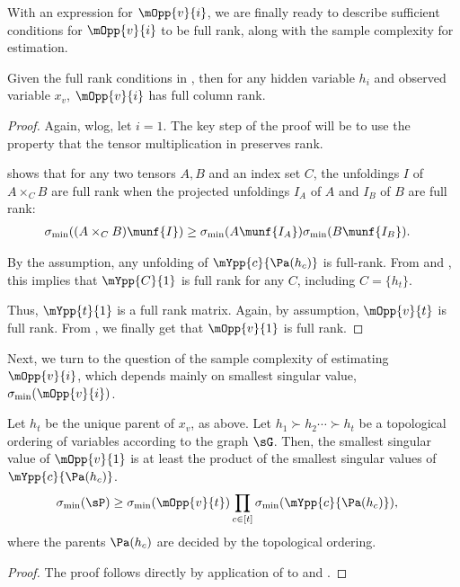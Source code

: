 With an expression for $\mOpp{v}{i}$, we are finally ready to describe
sufficient conditions for $\mOpp{v}{i}$ to be full rank, along with the
sample complexity for estimation.

\begin{lemma}
  \label{lem:full-rank-suff}
  Given the full rank conditions in , then
  for any hidden variable $h_i$ and observed variable $x_v$,
  $\mOpp{v}{i}$ has full column rank.
\end{lemma}
\begin{proof}
Again, wlog, let $i=1$. 
The key step of the proof will be to use the property that the tensor
  multiplication in  preserves rank.

 shows that for any two tensors $A,
  B$ and an index set $C$, the unfoldings $I$ of $A \times_C B$ are full
  rank when the projected unfoldings $I_A$ of $A$ and $I_B$ of $B$ are
  full rank:
\begin{align*}
  \sigma_{\min}( (A \times_C B)\munf{I} )
    &\ge \sigma_{\min}(A\munf{I_A}) \sigma_{\min}(B\munf{I_B}).
\end{align*}

By the assumption, any unfolding of $\mYpp{c}{\Pa(h_c)}$ is full-rank. 
From  and
  , this implies that $\mYpp{C}{1}$ is
  full rank for any $C$, including $C = \{h_t\}$.

Thus, $\mYpp{t}{1}$ is a full rank matrix. 
Again, by assumption,
  $\mOpp{v}{t}$ is full rank. From , we finally
  get that $\mOpp{v}{1}$ is full rank.
\end{proof}

Next, we turn to the question of the sample complexity of estimating
$\mOpp{v}{i}$, which depends mainly on smallest singular value,
$\sigma_{\min}(\mOpp{v}{i})$. 

\begin{lemma}
  \label{lem:mopp-singular-values}

Let $h_t$ be the unique parent of $x_v$, as above.
Let $h_1 \succ h_2 \cdots \succ h_t$ be a topological ordering of
  variables according to the graph $\sG$.
  Then, the smallest singular value of $\mOpp{v}{1}$ is at least the product of the smallest singular values of $\mYpp{c}{\Pa(h_c)}$.
\begin{align*}
  \sigma_{\min}(\sP) &\ge \sigma_{\min}(\mOpp{v}{t}) 
        \prod_{c \in [t]} \sigma_{\min}(\mYpp{c}{\Pa(h_c)}),
\end{align*}
where the parents $\Pa(h_c)$ are decided by the topological ordering. 
\end{lemma}
\begin{proof}
  The proof follows directly by application of
   to  and
  .
\end{proof}

